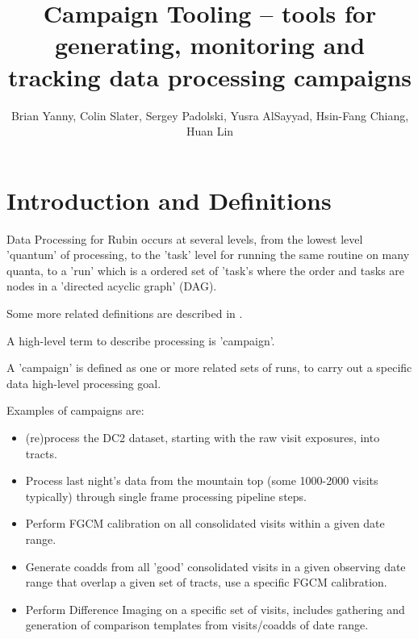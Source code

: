 \documentclass[DM,authoryear,toc]{lsstdoc}
\title{Campaign Tooling -- tools for generating, monitoring and tracking data processing campaigns}
\author{%
Brian Yanny, Colin Slater, Sergey Padolski, Yusra AlSayyad, Hsin-Fang Chiang, Huan Lin
}
\date{\vcsDate}
\begin{document}
\maketitle


\section{Introduction and Definitions}

Data Processing for Rubin occurs at several levels,
from the lowest level 'quantum' of processing, to the 'task' level for running
the same routine on many quanta, to a 'run' which is a ordered set of 'task's
where the order and tasks are nodes in a 'directed acyclic graph' (DAG).

Some more related definitions are described in \cite{DMTN-137}.

A high-level term to describe processing is 'campaign'.

A 'campaign' is defined as one or more related sets of runs, to carry out a
specific data high-level processing goal.  

Examples of campaigns are:

\begin{itemize}

\item (re)process the DC2 dataset, starting with the raw visit exposures,
 into tracts.  

\item Process last night's data from the mountain top (some 1000-2000 visits 
typically) through single frame processing pipeline steps.

\item Perform FGCM calibration on all consolidated visits within a given
date range.

\item Generate coadds from all 'good' consolidated visits in a given observing
date range that overlap a given set of tracts, use a specific FGCM calibration.

\item Perform Difference Imaging on a specific set of visits, includes gathering
and generation of comparison templates from visits/coadds of date range.

\end{itemize} 
\end{document}

